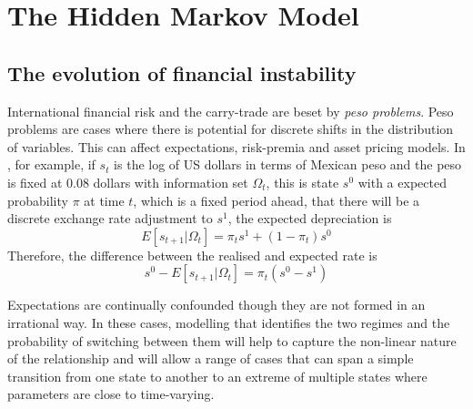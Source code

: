 \documentclass[12pt, a4paper, oneside]{article} %
\begin{document}

\section{The Hidden Markov Model}
\subsection{The evolution of financial instability}
International financial risk and the carry-trade are beset by \emph{peso problems}. Peso problems are cases where there is  potential for discrete shifts in the distribution of variables.  This can affect expectations, risk-premia and asset pricing models. In \citet{evans199621}, for example, if $s_t$ is the log of US dollars in terms of Mexican peso and the peso is fixed at 0.08 dollars with information set $\Omega_t$, this is state $s^0$ with a expected probability $\pi$ at time $t$, which is a fixed period ahead, that there will be a discrete exchange rate adjustment to $s^1$, the expected depreciation is 
\begin{equation}
E[s_{t+1}|\Omega_t] = \pi_ts^1 + (1 - \pi_t)s^0
\end{equation}
Therefore, the difference between the realised and expected rate is 
\begin{equation}
s^0 - E[s_{t+1}|\Omega_t] = \pi_t(s^0 - s^1)
\end{equation}


Expectations are continually confounded though they are not formed in an irrational way. In these cases, modelling that identifies the two regimes and the probability of switching between them will help to capture the non-linear nature of the relationship and will allow a range of cases that can span a simple transition from one state to another to an extreme of multiple states where parameters are close to time-varying.  
\end{document}

